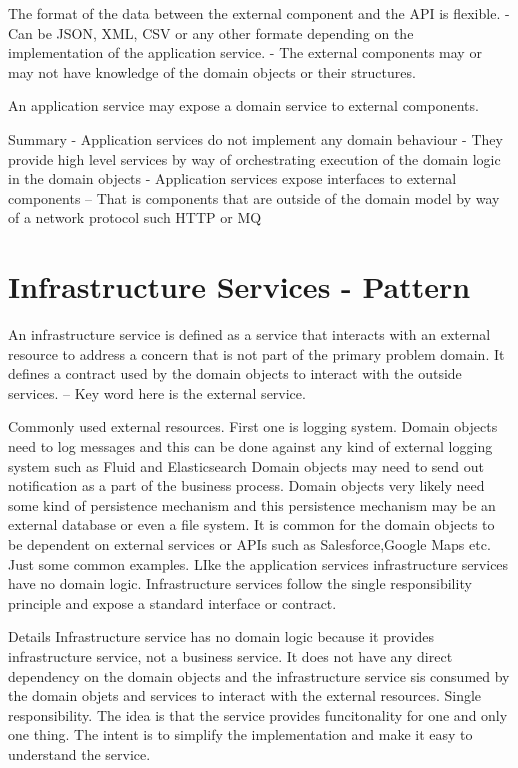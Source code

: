 \documentclass[a4paper, 11pt]{book}
\begin{document}
    The format of the data between the external component and the API is flexible.
    - Can be JSON, XML, CSV or any other formate depending on the implementation of the application service.
    - The external components may or may not have knowledge of the domain objects or their structures.

    An application service may expose a domain service to external components.

    Summary
    - Application services do not implement any domain behaviour
    - They provide high level services by way of orchestrating execution of the domain logic in the domain objects
    - Application services expose interfaces to external components
    -- That is components that are outside of the domain model by way of a network protocol such HTTP or MQ


    \section{Infrastructure Services - Pattern}
    An infrastructure service is defined as a service that interacts with an external resource to address a concern that is not part of the primary problem domain.
    It defines a contract used by the domain objects to interact with the outside services.
    -- Key word here is the external service.

    Commonly used external resources.
    First one is logging system.
    Domain objects need to log messages and this can be done against any kind of external logging system such as Fluid and Elasticsearch
    Domain objects may need to send out notification as a part of the business process.
    Domain objects very likely need some kind of persistence mechanism and this persistence mechanism may be an external database or even a file system.
    It is common for the domain objects to be dependent on external services or APIs such as Salesforce,Google Maps etc. Just some common examples.
    LIke the application services infrastructure services have no domain logic.
    Infrastructure services follow the single responsibility principle and expose a standard interface or contract.

    Details
    Infrastructure service has no domain logic because it provides infrastructure service, not a business service.
    It does not have any direct dependency on the domain objects and the infrastructure service sis consumed by the domain objets and services to interact with the external resources.
    Single responsibility. The idea is that the service provides funcitonality for one and only one thing.
    The intent is to simplify the implementation and make it easy to understand the service.
\end{document}
